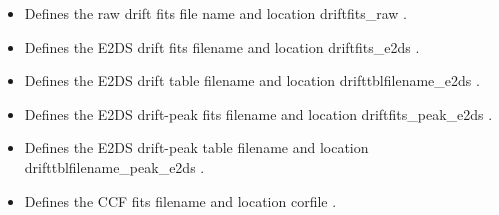 \begin{itemize}
	\item {} 
	{Defines the raw drift fits file name and location}
	{driftfits\_raw}
	{\calDRIFTRAW}{\spirouConst.}{\calDRIFTRAW}
\end{itemize}

\begin{itemize}
	\item {} 
	{Defines the E2DS drift fits filename and location}
	{driftfits\_e2ds}
	{\calDRIFTE}{\spirouConst.}{\calDRIFTE}
\end{itemize}


\begin{itemize}
	\item {} 
	{Defines the E2DS drift table filename and location}
	{drifttblfilename\_e2ds}
	{\calDRIFTE}{\spirouConst.}{\calDRIFTE}
\end{itemize}


\begin{itemize}
	\item {} 
	{Defines the E2DS drift-peak fits filename and location}
	{driftfits\_peak\_e2ds}
	{\calDRIFTPEAK}{\spirouConst.}{\calDRIFTPEAK}
\end{itemize}


\begin{itemize}
	\item {} 
	{Defines the E2DS drift-peak table filename and location}
	{drifttblfilename\_peak\_e2ds}
	{\calDRIFTPEAK}{\spirouConst.}{\calDRIFTPEAK}
\end{itemize}


\begin{itemize}
	\item {} 
	{Defines the CCF fits filename and location}
	{corfile}
	{\calCCF}{\spirouConst.}{\calCCF}
\end{itemize}

